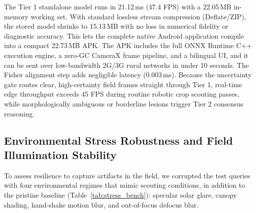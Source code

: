 \documentclass[conference]{IEEEtran}
\begin{document}
\begin{table}[htbp]
\caption{Edge Hardware INT8 Quantization \& Latency Profile (ONNX Runtime, 4-Thread CPU)}
\label{tab:edge_bench}
\centering
{}
\end{table}

The Tier 1 standalone model runs in 21.12\,ms (47.4 FPS) with a 22.05\,MB in-memory working set. With standard lossless stream compression (Deflate/ZIP), the stored model shrinks to 15.13\,MB with no loss in numerical fidelity or diagnostic accuracy. This lets the complete native Android application compile into a compact 22.73\,MB APK. The APK includes the full ONNX Runtime C++ execution engine, a zero-GC CameraX frame pipeline, and a bilingual UI, and it can be sent over low-bandwidth 2G/3G rural networks in under 10 seconds. The Fisher alignment step adds negligible latency (0.003\,ms). Because the uncertainty gate routes clear, high-certainty field frames straight through Tier 1, real-time edge throughput exceeds 45 FPS during routine robotic crop scouting passes, while morphologically ambiguous or borderline lesions trigger Tier 2 consensus reasoning.

\subsection{Environmental Stress Robustness and Field Illumination Stability}
To assess resilience to capture artifacts in the field, we corrupted the test queries with four environmental regimes that mimic scouting conditions, in addition to the pristine baseline (Table~\ref{tab:stress_bench}): specular solar glare, canopy shading, hand-shake motion blur, and out-of-focus defocus blur.
\end{document}
